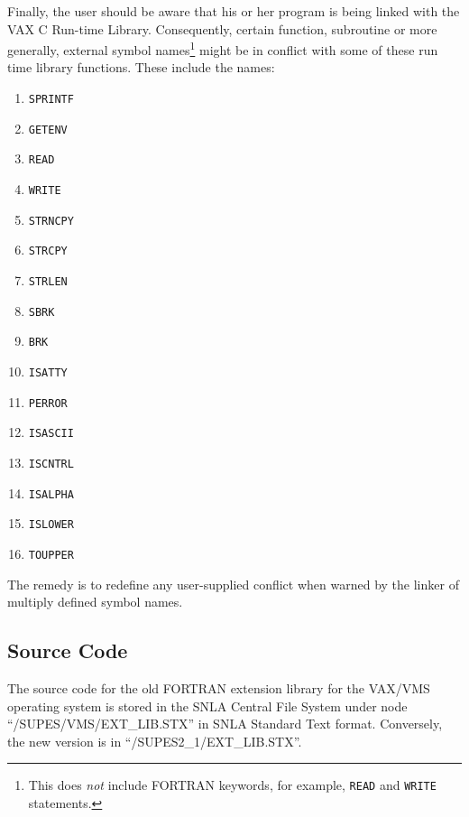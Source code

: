 Finally,
the user should be aware that his or her program is being
linked with the VAX C Run-time Library.
Consequently,
certain function,
subroutine
or more generally,
external symbol names\footnote{This does {\em not}
include FORTRAN keywords, for example, \verb+READ+ and
\verb+WRITE+ statements.}
might be in conflict with some of these
run time library functions.
These include the names:
\begin{enumerate}

\item \verb+SPRINTF+

\item \verb+GETENV+

\item \verb+READ+

\item \verb+WRITE+

\item \verb+STRNCPY+

\item \verb+STRCPY+

\item \verb+STRLEN+

\item \verb+SBRK+

\item \verb+BRK+

\item \verb+ISATTY+

\item \verb+PERROR+

\item \verb+ISASCII+

\item \verb+ISCNTRL+

\item \verb+ISALPHA+

\item \verb+ISLOWER+

\item \verb+TOUPPER+
\end{enumerate}
The remedy is to redefine any user-supplied conflict
when warned by the linker of multiply defined symbol names.

\subsection{Source Code}
The source code for the old FORTRAN extension library for the VAX/VMS operating
system is stored in the SNLA Central File System under node
``/SUPES/VMS/EXT\_LIB.STX'' in SNLA Standard Text format.
Conversely,
the new version is in
``/SUPES2\_1/EXT\_LIB.STX''.

